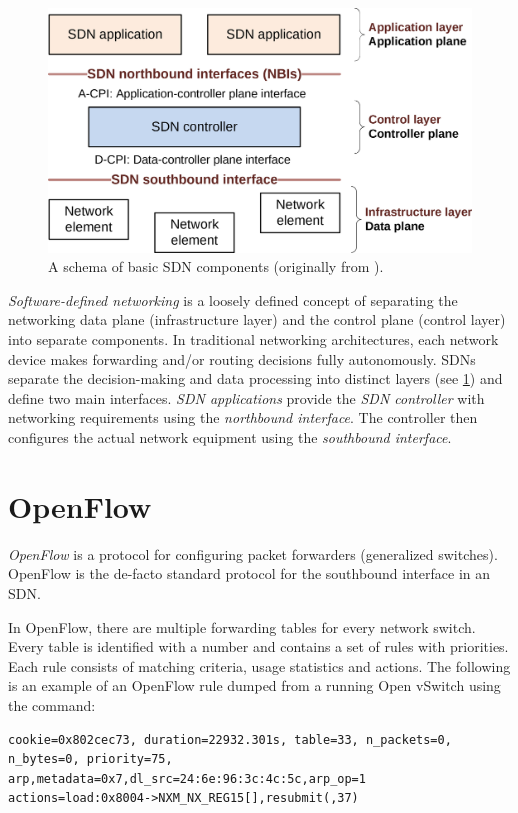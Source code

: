 \begin{figure}
    \centering
    \includegraphics[width=.6\linewidth]{img/sdn_basic_schema.png}
    \caption{A schema of basic SDN components (originally from \cite{SdnArch}).}
    \label{fig:sdn-schema}
\end{figure}

\emph{Software-defined networking} is a loosely defined concept of separating the networking data plane (infrastructure layer) and the control plane (control layer) into separate components. In traditional networking architectures, each network device makes forwarding and/or routing decisions fully autonomously. SDNs separate the decision-making and data processing into distinct layers (see \cref{fig:sdn-schema}) and define two main interfaces. \emph{SDN applications} provide the \emph{SDN controller} with networking requirements using the \emph{northbound interface}. The controller then configures the actual network equipment using the \emph{southbound interface}.

\section{OpenFlow}
\label{sec:openflow}

\emph{OpenFlow} \cite{OFSpec} is a protocol for configuring packet forwarders (generalized switches). OpenFlow is the de-facto standard protocol for the southbound interface in an SDN.

In OpenFlow, there are multiple forwarding tables for every network switch. Every table is identified with a number and contains a set of rules with priorities. Each rule consists of matching criteria, usage statistics and actions. The following is an example of an OpenFlow rule dumped from a running Open vSwitch using the  command:

\begin{verbatim}
cookie=0x802cec73, duration=22932.301s, table=33, n_packets=0,
n_bytes=0, priority=75,
arp,metadata=0x7,dl_src=24:6e:96:3c:4c:5c,arp_op=1
actions=load:0x8004->NXM_NX_REG15[],resubmit(,37)
\end{verbatim}

